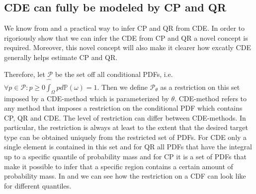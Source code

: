 \subsection{CDE can fully be modeled by CP and QR} \label{sec:cde_sub_cp_qr}

We know from  and  a practical way to infer CP and QR from CDE. In order to rigoriously show that we can infer the CDE from CP and QR a novel concept is required. Moreover, this novel concept will also make it clearer how excatly CDE generally helps estimate CP and QR.

Therefore, let $\mathcal{P}$ be the set off all conditional PDFs, i.e. $\forall p\in\mathcal{P}: p \geq 0 \hat \int_{\Omega} p d \mathbb{P}(\omega) = 1$. Then we define $\mathcal{P}_{\theta}$ as a restriction on this set imposed by a CDE-method which is parameterized by $\theta$. CDE-method refers to any method that imposes a restriction on the conditional PDF which contains CP, QR and CDE. The level of restriction can differ between CDE-methods. In particular, the restriction is always at least to the extent that the desired target type can be obtained uniquely from the restricted set of PDFs. For CDE only a single element is contained in this set and for QR all PDFs that have the integral up to a specific quantile of probability mass and for CP it is a set of PDFs that make it possible to infer that a specific region contains a certain amount of probability mass. In  and  we can see how the restriction on a CDF can look like for different quantiles. %


